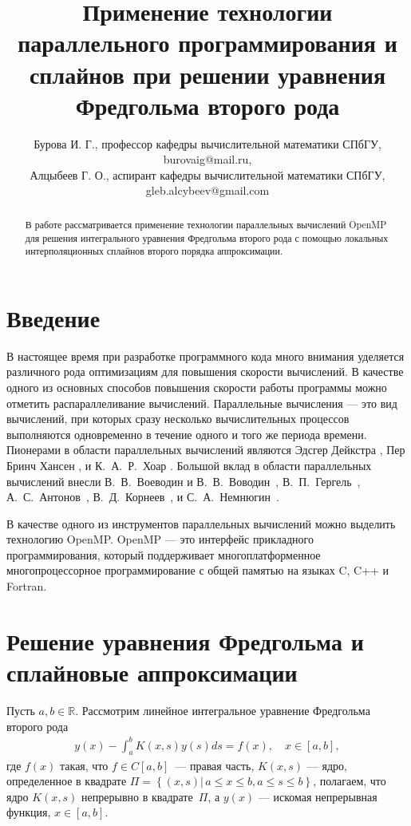 \documentclass{spisok-article}
\title{Применение технологии параллельного программирования и сплайнов при решении уравнения Фредгольма второго рода}
\author{
	Бурова И. Г., профессор кафедры вычислительной математики СПбГУ, burovaig@mail.ru,\\
	Алцыбеев Г. О., аспирант кафедры вычислительной математики СПбГУ, gleb.alcybeev@gmail.com
}
\begin{document}
\maketitle

\begin{abstract}
В работе рассматривается применение технологии параллельных вычислений OpenMP для решения интегрального уравнения Фредгольма второго рода с помощью локальных интерполяционных сплайнов второго порядка аппроксимации.
\end{abstract}

\section{Введение}

В настоящее время при разработке программного кода много внимания уделяется различного рода оптимизациям для повышения скорости вычислений. В качестве одного из основных способов повышения скорости работы программы можно отметить распараллеливание вычислений. Параллельные вычисления --- это вид вычислений, при которых сразу несколько вычислительных процессов выполняются одновременно в течение одного и того же периода времени.
Пионерами в области параллельных вычислений являются Эдсгер Дейкстра \cite{De}, Пер Бринч Хансен \cite{PerBrinchHansen1}, \cite{PerBrinchHansen2} и К.~А.~Р.~Хоар \cite{hoare}. Большой вклад в области параллельных вычислений внесли В.~В.~Воеводин и В.~В.~Воводин~\cite{Voevodin}, В.~П.~Гергель~\cite{Gergel}, А.~С.~Антонов~\cite{Antonov}, В.~Д.~Корнеев~\cite{Korneev}, и С.~А.~Немнюгин~\cite{Nemn}.

В качестве одного из инструментов параллельных вычислений можно выделить технологию OpenMP. OpenMP --- это интерфейс прикладного программирования, который поддерживает многоплатформенное многопроцессорное программирование с общей памятью на языках C, C++ и Fortran.


\section{Решение уравнения Фредгольма и сплайновые аппроксимации}
Пусть $a,b\in\mathbb{R}$. Рассмотрим линейное интегральное уравнение Фредгольма второго рода 
$$
	\begin{gathered}
		y\left(x\right)-\int^b_a K\left(x,s\right)y\left(s\right)ds=f\left(x\right),\quad x\in \left[a,b\right],
	\end{gathered}
$$
где $f\left(x\right)$ такая, что $f\in C\left[a,b\right]$~--- правая часть, $K\left(x,s\right)$ --- ядро, определенное в квадрате $\Pi =\left\{\left(x,s\right) |\, a \leqslant x \leqslant b, a\leqslant s\leqslant b\right\}$, полагаем, что ядро $K\left(x,s\right)$ непрерывно в квадрате~$\Pi$, а $y\left(x\right)$ --- искомая непрерывная функция, $x\in\left[a,b\right]$.
\end{document}
